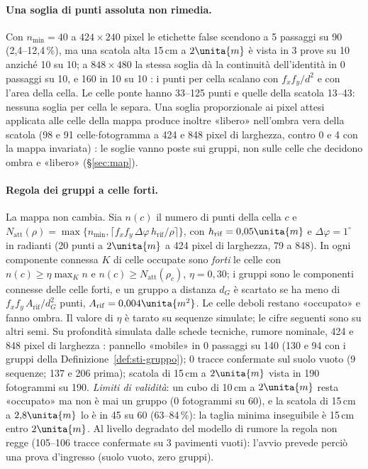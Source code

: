 \paragraph{Una soglia di punti assoluta non rimedia.} Con $n_{\min}=40$ a $424\times240$ pixel le etichette false scendono a 5 passaggi su 90 (2,4--12,4\,\%), ma una scatola alta 15\,cm a $2\unita{m}$ è vista in 3 prove su 10 anziché 10 su 10; a $848\times480$ la stessa soglia dà la continuità dell'identità in 0 passaggi su 10, e 160 in 10 su 10 : i punti per cella scalano con $f_xf_y/d^2$ e con l'area della cella. Le celle ponte hanno 33--125 punti e quelle della scatola 13--43: nessuna soglia per cella le separa. Una soglia proporzionale ai pixel attesi applicata alle celle della mappa produce inoltre «libero» nell'ombra vera della scatola (98 e 91 celle$\cdot$fotogramma a 424 e 848 pixel di larghezza, contro 0 e 4 con la mappa invariata) : le soglie vanno poste sui gruppi, non sulle celle che decidono ombra e «libero» (\S\ref{sec:map}).

\paragraph{Regola dei gruppi a celle forti.} La mappa non cambia. Sia $n(c)$ il numero di punti della cella $c$ e $N_{\mathrm{att}}(\rho)=\max\{n_{\min},\lceil f_xf_y\,\Delta\varphi\,h_{\mathrm{rif}}/\rho\rceil\}$, con $h_{\mathrm{rif}}=0{,}05\unita{m}$ e $\Delta\varphi=1^\circ$ in radianti (20 punti a $2\unita{m}$ a 424 pixel di larghezza, 79 a 848). In ogni componente connessa $K$ di celle occupate sono \emph{forti} le celle con $n(c)\ge\eta\max_K n$ e $n(c)\ge N_{\mathrm{att}}(\rho_c)$, $\eta=0{,}30$; i gruppi sono le componenti connesse delle celle forti, e un gruppo a distanza $d_G$ è scartato se ha meno di $f_xf_y\,A_{\mathrm{rif}}/d_G^2$ punti, $A_{\mathrm{rif}}=0{,}004\unita{m^2}$. Le celle deboli restano «occupato» e fanno ombra. Il valore di $\eta$ è tarato su sequenze simulate; le cifre seguenti sono su altri semi. Su profondità simulata dalle schede tecniche, rumore nominale, 424 e 848 pixel di larghezza : pannello «mobile» in 0 passaggi su 140 (130 e 94 con i gruppi della Definizione~\ref{def:sti-gruppo}); 0 tracce confermate sul suolo vuoto (9 sequenze; 137 e 206 prima); scatola di 15\,cm a $2\unita{m}$ vista in 190 fotogrammi su 190. \emph{Limiti di validità}: un cubo di 10\,cm a $2\unita{m}$ resta «occupato» ma non è mai un gruppo (0 fotogrammi su 60), e la scatola di 15\,cm a $2{,}8\unita{m}$ lo è in 45 su 60 (63--84\,\%): la taglia minima inseguibile è 15\,cm entro $2\unita{m}$. Al livello degradato del modello di rumore la regola non regge (105--106 tracce confermate su 3 pavimenti vuoti): l'avvio prevede perciò una prova d'ingresso (suolo vuoto, zero gruppi).


